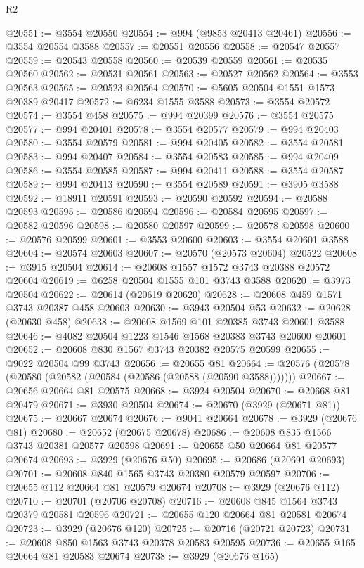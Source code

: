 \begin{lexlean}{R2}
\begin{coremodule}
@20551 := @3554 @20550
@20554 := @994 (@9853 @20413 @20461)
@20556 := @3554 @20554 @3588
@20557 := @20551 @20556
@20558 := @20547 @20557
@20559 := @20543 @20558
@20560 := @20539 @20559
@20561 := @20535 @20560
@20562 := @20531 @20561
@20563 := @20527 @20562
@20564 := @3553 @20563
@20565 := @20523 @20564
@20570 := @5605 @20504 @1551 @1573 @20389 @20417
@20572 := @6234 @1555 @3588
@20573 := @3554 @20572
@20574 := @3554 @458
@20575 := @994 @20399
@20576 := @3554 @20575
@20577 := @994 @20401
@20578 := @3554 @20577
@20579 := @994 @20403
@20580 := @3554 @20579
@20581 := @994 @20405
@20582 := @3554 @20581
@20583 := @994 @20407
@20584 := @3554 @20583
@20585 := @994 @20409
@20586 := @3554 @20585
@20587 := @994 @20411
@20588 := @3554 @20587
@20589 := @994 @20413
@20590 := @3554 @20589
@20591 := @3905 @3588
@20592 := @18911 @20591
@20593 := @20590 @20592
@20594 := @20588 @20593
@20595 := @20586 @20594
@20596 := @20584 @20595
@20597 := @20582 @20596
@20598 := @20580 @20597
@20599 := @20578 @20598
@20600 := @20576 @20599
@20601 := @3553 @20600
@20603 := @3554 @20601 @3588
@20604 := @20574 @20603
@20607 := @20570 (@20573 @20604) @20522
@20608 := @3915 @20504
@20614 := @20608 @1557 @1572 @3743 @20388 @20572 @20604
@20619 := @6258 @20504 @1555 @101 @3743 @3588
@20620 := @3973 @20504
@20622 := @20614 (@20619 @20620)
@20628 := @20608 @459 @1571 @3743 @20387 @458 @20603
@20630 := @3943 @20504 @53
@20632 := @20628 (@20630 @458)
@20638 := @20608 @1569 @101 @20385 @3743 @20601 @3588
@20646 := @4082 @20504 @1223 @1546 @1568 @20383 @3743 @20600 @20601
@20652 := @20608 @830 @1567 @3743 @20382 @20575 @20599
@20655 := @9022 @20504 @99 @3743
@20656 := @20655 @81
@20664 := @20576 (@20578 (@20580 (@20582 (@20584 (@20586 (@20588 (@20590 @3588)))))))
@20667 := @20656 @20664 @81 @20575
@20668 := @3924 @20504
@20670 := @20668 @81 @20479
@20671 := @3930 @20504
@20674 := @20670 (@3929 (@20671 @81))
@20675 := @20667 @20674
@20676 := @9041 @20664
@20678 := @3929 (@20676 @81)
@20680 := @20652 (@20675 @20678)
@20686 := @20608 @835 @1566 @3743 @20381 @20577 @20598
@20691 := @20655 @50 @20664 @81 @20577 @20674
@20693 := @3929 (@20676 @50)
@20695 := @20686 (@20691 @20693)
@20701 := @20608 @840 @1565 @3743 @20380 @20579 @20597
@20706 := @20655 @112 @20664 @81 @20579 @20674
@20708 := @3929 (@20676 @112)
@20710 := @20701 (@20706 @20708)
@20716 := @20608 @845 @1564 @3743 @20379 @20581 @20596
@20721 := @20655 @120 @20664 @81 @20581 @20674
@20723 := @3929 (@20676 @120)
@20725 := @20716 (@20721 @20723)
@20731 := @20608 @850 @1563 @3743 @20378 @20583 @20595
@20736 := @20655 @165 @20664 @81 @20583 @20674
@20738 := @3929 (@20676 @165)

\end{coremodule}
\end{lexlean}
